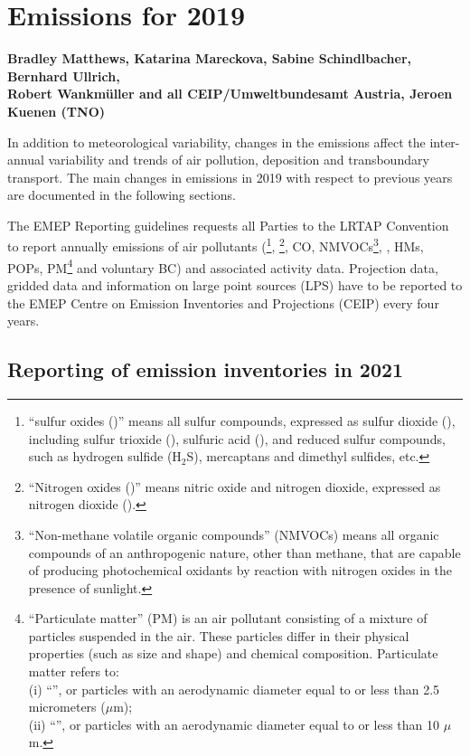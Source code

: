 \chapter[Emissions 2019]{Emissions for 2019}
\label{ch:emis2019}

{\bf{Bradley Matthews, Katarina Mareckova, Sabine Schindlbacher, Bernhard Ullrich, \\
Robert Wankm\"uller and all CEIP/Umweltbundesamt Austria, Jeroen Kuenen (TNO)}}
\vspace{30pt}

In addition to meteorological variability, changes in the emissions
affect the inter-annual variability and trends of air pollution,
deposition and transboundary transport.  
The main changes in emissions in 2019 with respect to previous years
are documented in the following sections.


The EMEP Reporting guidelines \citep{UNECE2014} requests all Parties
to the LRTAP Convention to report annually emissions of air pollutants
(\sox\footnote{``sulfur oxides (\sox)'' means all sulfur compounds,
  expressed as sulfur dioxide (\soii), including sulfur trioxide
  (\soiii), sulfuric acid (\sulacid), and reduced sulfur compounds,
  such as hydrogen sulfide (H${_2}$S), mercaptans and dimethyl
  sulfides, etc.}, \noii\footnote{``Nitrogen oxides (\nox)'' means
  nitric oxide and nitrogen dioxide, expressed as nitrogen dioxide
  (\noii).}, CO, NMVOCs\footnote{``Non-methane volatile organic
  compounds'' (NMVOCs) means all organic compounds of an anthropogenic
  nature, other than methane, that are capable of producing
  photochemical oxidants by reaction with nitrogen oxides in the
  presence of sunlight.}, \nhiii, HMs, POPs,
PM\footnote{``Particulate matter'' (PM) is an air pollutant
  consisting of a mixture of particles suspended in the air. These
  particles differ in their physical properties (such as size and
  shape) and chemical composition. Particulate matter refers to:\\  
(i) ``\PM[2.5]'', or particles with an aerodynamic diameter equal to or
  less than 2.5 micrometers ($\mu$m);\\ 
(ii) ``\PM[10]'', or particles with an aerodynamic diameter equal to or
  less than 10 $\mu$m.} and voluntary BC) and associated activity data. Projection data, gridded data and information on large point sources (LPS) 
have to be reported to the EMEP Centre on Emission Inventories and Projections (CEIP) every four years.

\section{Reporting of emission inventories in 2021}

